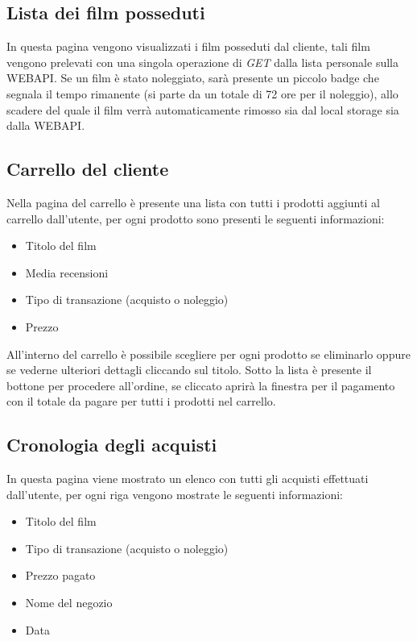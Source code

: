 \documentclass{article}
\begin{document}
    \subsection{Lista dei film posseduti}
    In questa pagina vengono visualizzati i film posseduti dal cliente, tali film vengono prelevati con una singola operazione di \emph{GET} dalla lista personale sulla WEBAPI.
    Se un film è stato noleggiato, sarà presente un piccolo badge che segnala il tempo rimanente (si parte da un totale di 72 ore per il noleggio), allo scadere del quale
    il film verrà automaticamente rimosso sia dal local storage sia dalla WEBAPI.

    \subsection{Carrello del cliente}
    Nella pagina del carrello è presente una lista con tutti i prodotti aggiunti al carrello dall'utente, per ogni prodotto sono presenti le seguenti informazioni:
    \begin{itemize}
        \item Titolo del film 
        \item Media recensioni
        \item Tipo di transazione (acquisto o noleggio)
        \item Prezzo
    \end{itemize}
    All'interno del carrello è possibile scegliere per ogni prodotto se eliminarlo oppure se vederne ulteriori dettagli cliccando sul titolo.
    Sotto la lista è presente il bottone per procedere all'ordine, se cliccato aprirà la finestra per il pagamento con il totale da pagare per tutti i prodotti nel carrello.

    \subsection{Cronologia degli acquisti}
    
    In questa pagina viene mostrato un elenco con tutti gli 
    acquisti effettuati dall'utente, per ogni riga vengono mostrate le seguenti informazioni:
    \begin{itemize}
        \item Titolo del film
        \item Tipo di transazione (acquisto o noleggio)
        \item Prezzo pagato
        \item Nome del negozio
        \item Data
    \end{itemize}
\end{document}
